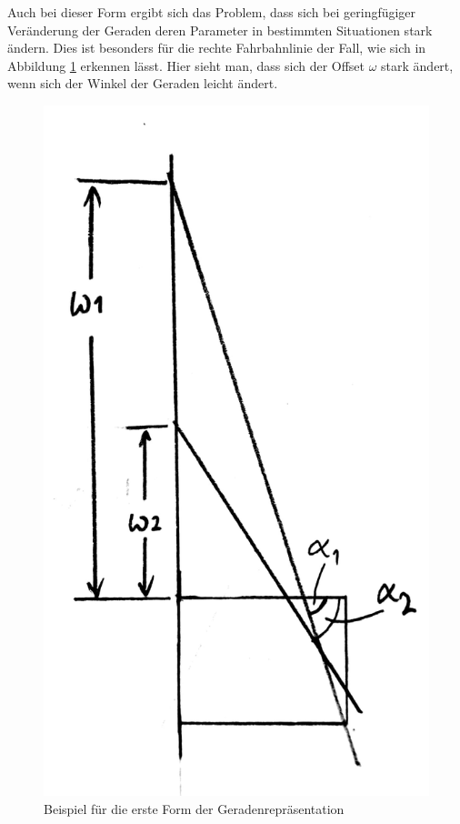 	Auch bei dieser Form ergibt sich das Problem, dass sich bei geringfügiger Veränderung der Geraden deren Parameter in bestimmten Situationen stark ändern. Dies ist besonders für die rechte Fahrbahnlinie der Fall, wie sich in Abbildung \ref{fig:alpha_omega2} erkennen lässt. Hier sieht man, dass sich der Offset $\omega$ stark ändert, wenn sich der Winkel der Geraden leicht ändert.


	\begin{figure}[H]
		\centering
		\includegraphics[width=.3\linewidth]{images/alpha_omega2.jpg}
		\caption{Beispiel für die erste Form der Geradenrepräsentation}
		\label{fig:alpha_omega2}
	\end{figure}
	
